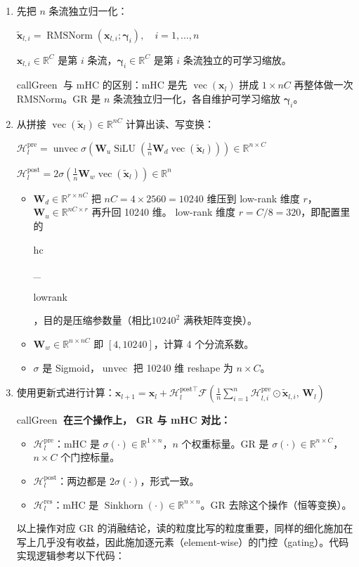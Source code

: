 \documentclass[zihao=false,fontset=windows]{ctexart}
\newcommand{\bigmath}[1]{%
  \begin{center}\large$\displaystyle #1$\end{center}%
}
\begin{document}
\begin{enumerate}
\item 先把 $n$ 条流独立归一化：
\bigmath{\widetilde{\mathbf x}_{l,i}=\operatorname{RMSNorm}(\mathbf x_{l,i};\boldsymbol\gamma_i),\quad i=1,\ldots,n}
$\mathbf x_{l,i}\in\mathbb R^C$ 是第 $i$ 条流，$\boldsymbol\gamma_i\in\mathbb R^C$ 是第 $i$ 条流独立的可学习缩放。

\begin{feishubox}{callGreen}{🧭}
与 mHC 的区别：mHC 是先 $\operatorname{vec}(\mathbf x_l)$ 拼成 $1\times nC$ 再整体做一次 RMSNorm。GR 是 $n$ 条流独立归一化，各自维护可学习缩放 $\boldsymbol\gamma_i$。

\end{feishubox}
\item 从拼接 $\operatorname{vec}(\widetilde{\mathbf x}_l)\in\mathbb R^{nC}$ 计算出读、写变换：
\bigmath{\mathcal H_l^{\mathrm{pre}}=\operatorname{unvec}\sigma\!\left(\mathbf W_u\operatorname{SiLU}\!\left(\frac1n\mathbf W_d\operatorname{vec}(\widetilde{\mathbf x}_l)\right)\right)\in\mathbb R^{n\times C}}
\bigmath{\mathcal H_l^{\mathrm{post}}=2\sigma\!\left(\frac1n\mathbf W_w\operatorname{vec}(\widetilde{\mathbf x}_l)\right)\in\mathbb R^n}
\begin{itemize}
\item $\mathbf W_d\in\mathbb R^{r\times nC}$ 把 $nC=4\times2560=10240$ 维压到 low-rank 维度 $r$，$\mathbf W_u\in\mathbb R^{nC\times r}$ 再升回 10240 维。 low-rank 维度 $r=C/8=320$，即配置里的 {\setlength{\fboxsep}{0pt}\colorbox{inlinebg}{\strut\ttfamily hc}\colorbox{inlinebg}{\strut\ttfamily \_}\allowbreak{}\colorbox{inlinebg}{\strut\ttfamily lowrank}}，目的是压缩参数量（相比$10240^2$ 满秩矩阵变换）。
\item $\mathbf W_w\in\mathbb R^{n\times nC}$ 即 $[4,10240]$，计算 4 个分流系数。
\item $\sigma$ 是 Sigmoid，$\operatorname{unvec}$ 把 10240 维 reshape 为 $n\times C$。
\end{itemize}
\item 使用更新式进行计算：$\mathbf x_{l+1}=\mathbf x_l+\mathcal H_l^{\mathrm{post}\top}\mathcal F\!\left(\frac1n\sum_{i=1}^n\mathcal H_{l,i}^{\mathrm{pre}}\odot\widetilde{\mathbf x}_{l,i},\,\mathbf W_l\right)$
\begin{feishubox}{callGreen}{🧭}
\textcolor{feishuRed}{\textbf{在三个操作上， GR 与 mHC 对比：}}

\begin{itemize}
\item $\mathcal H_l^{\mathrm{pre}}$：mHC 是 $\sigma(\cdot)\in\mathbb R^{1\times n}$，$n$ 个权重标量。GR 是 $\sigma(\cdot)\in\mathbb R^{n\times C}$，$n\times C$ 个门控标量。
\item $\mathcal H_l^{\mathrm{post}}$：两边都是 $2\sigma(\cdot)$，形式一致。
\item $\mathcal H_l^{\mathrm{res}}$：mHC 是 $\operatorname{Sinkhorn}(\cdot)\in\mathbb R^{n\times n}$。GR 去除这个操作（恒等变换）。
\end{itemize}
以上操作对应 GR 的消融结论，读的粒度比写的粒度重要，同样的细化施加在写上几乎没有收益，因此施加逐元素（element-wise）的门控（gating）。代码实现逻辑参考以下代码：


\end{feishubox}
\end{enumerate}
\end{document}

